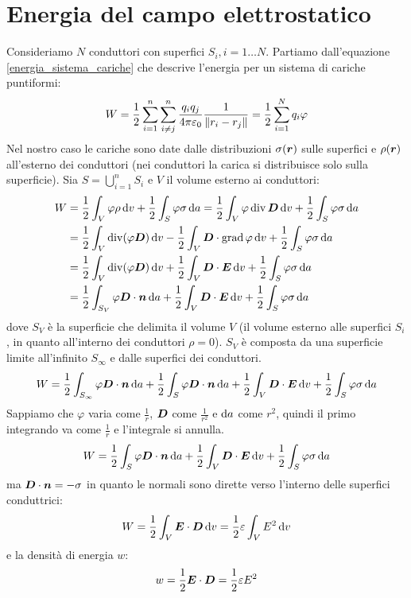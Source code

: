 \section{Energia del campo elettrostatico}
Consideriamo $N$ conduttori con superfici $S_i, i=1\ldots N$. Partiamo dall'equazione \eqref{energia_sistema_cariche} che descrive l'energia per un sistema di cariche puntiformi:
\begin{equation}
  \label{eq:en_cariche_puntiformi}
  W=\frac{1}{2}\sum_{i=1}^n\sum_{i\neq j}^n\frac{q_iq_j}{4\pi\varepsilon_0}\frac{1}{\left\lVert r_i-r_j\right\rVert}=\frac{1}{2}\sum_{i=1}^{N}q_i\varphi
\end{equation}
Nel nostro caso le cariche sono date dalle distribuzioni $\sigma(\boldsymbol{r})$ sulle superfici e $\rho(\boldsymbol{r})$ all'esterno dei conduttori (nei conduttori la carica si distribuisce solo sulla superficie). Sia $S=\bigcup_{i=1}^n S_i$ e $V$ il volume esterno ai conduttori:
\begin{equation}
  \begin{split}
    W&=\frac{1}{2}\int_V\varphi\rho\,\mathrm{d} v+\frac{1}{2}\int_S\varphi\sigma\,\mathrm{d} a=
    \frac{1}{2}\int_V\varphi\operatorname{div}\boldsymbol{D}\,\mathrm{d} v+\frac{1}{2}\int_S\varphi\sigma\,\mathrm{d} a\\
    &=\frac{1}{2}\int_V\operatorname{div}(\varphi\boldsymbol{D})\,\mathrm{d} v-\frac{1}{2}\int_V\boldsymbol{D}\cdot\operatorname{grad}\varphi\,\mathrm{d} v+\frac{1}{2}\int_S\varphi\sigma\,\mathrm{d} a\\
    &=\frac{1}{2}\int_V\operatorname{div}(\varphi\boldsymbol{D})\,\mathrm{d} v+\frac{1}{2}\int_V\boldsymbol{D}\cdot\boldsymbol{E}\,\mathrm{d} v+\frac{1}{2}\int_S\varphi\sigma\,\mathrm{d} a\\
    &=\frac{1}{2}\int_{S_V}\varphi\boldsymbol{D}\cdot\boldsymbol{n}\,\mathrm{d} a+\frac{1}{2}\int_V\boldsymbol{D}\cdot\boldsymbol{E}\,\mathrm{d} v+\frac{1}{2}\int_S\varphi\sigma\,\mathrm{d} a
  \end{split}
\end{equation}
dove $S_V$ è la superficie che delimita il volume $V$ (il volume esterno alle superfici $S_i$, in quanto all'interno dei conduttori $\rho=0$). $S_V$ è composta da una superficie limite all'infinito $S_\infty$ e dalle superfici dei conduttori.
\begin{equation}
  W=\frac{1}{2}\int_{S_\infty}\varphi\boldsymbol{D}\cdot\boldsymbol{n}\,\mathrm{d} a+\frac{1}{2}\int_{S}\varphi\boldsymbol{D}\cdot\boldsymbol{n}\,\mathrm{d} a+\frac{1}{2}\int_V\boldsymbol{D}\cdot\boldsymbol{E}\,\mathrm{d} v+\frac{1}{2}\int_S\varphi\sigma\,\mathrm{d} a
\end{equation}
Sappiamo che $\varphi$ varia come $\frac{1}{r}$, $\boldsymbol{D}$ come $\frac{1}{r^2}$ e $\mathrm{d} a$ come $r^2$, quindi il primo integrando va come $\frac{1}{r}$ e l'integrale si annulla.
\begin{equation}
  W=\frac{1}{2}\int_{S}\varphi\boldsymbol{D}\cdot\boldsymbol{n}\,\mathrm{d} a+\frac{1}{2}\int_V\boldsymbol{D}\cdot\boldsymbol{E}\,\mathrm{d} v+\frac{1}{2}\int_S\varphi\sigma\,\mathrm{d} a
\end{equation}
ma $\boldsymbol{D}\cdot\boldsymbol{n}=-\sigma$ in quanto le normali sono dirette verso l'interno delle superfici conduttrici:
\begin{equation}
  W=\frac{1}{2}\int_V\boldsymbol{E}\cdot\boldsymbol{D}\,\mathrm{d} v=\frac{1}{2}\varepsilon\int_V E^2\,\mathrm{d} v
\end{equation}
e la densità di energia $w$:
\begin{equation}
  \label{eq:en_campo_el}
  w=\frac{1}{2}\boldsymbol{E}\cdot\boldsymbol{D}=\frac{1}{2}\varepsilon E^2
\end{equation}

